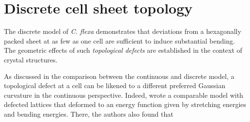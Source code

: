 \section{Discrete cell sheet topology}

The discrete model of \textit{C. flexa} demonstrates that deviations from a hexagonally packed sheet at as few as one cell are sufficient to induce substantial bending.
The geometric effects of such \textit{topological defects} are established in the context of crystal structures.

As discussed in the comparison between the continuous and discrete model, a topological defect at a cell can be likened to a different preferred Gaussian curvature in the continuous perspective. 
Indeed, \citet{seung1988} wrote a comparable model with defected lattices that deformed to an energy function given by stretching energies and bending energies.
There, the authors also found that 

